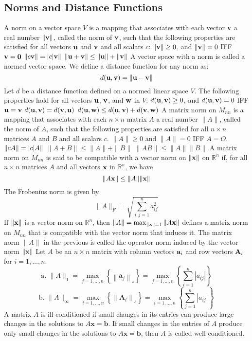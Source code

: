 \documentclass{article}
\begin{document}
        \subsection{Norms and Distance Functions} 
        \begin{outline}
            \1 A norm on a vector space $V$ is a mapping that associates with each vector $\vb v$ a real number $\|\vb v\|$, called the norm of $\vb v$, such that the following properties are satisfied for all vectors $\vb u$ and $\vb v$ and all scalars $c$:
            \2 \(\|\vb v\|\geq 0\), and \(\|\vb v\|=0\) IFF \(\vb v=\vb 0\)
            \2 \(\|c\vb v\|=|c\\|\vb v\|\)
            \2 \(\|\vb u+\vb v\|\leq\|\vb u\|+\|\vb v\|\)
        \1 A vector space with a norm is called a normed vector space. 
        \1 We define a distance function for any norm as: \[d(\vb u,\vb v)=\|\vb u-\vb v\|\]
        \1 Let $d$ be a distance function defined on a normed linear space $V$. The following properties hold for all vectors $\vb u$, $\vb v$, and $\vb w$ in $V$:
            \2 \(d(\vb u,\vb v)\geq 0\), and \(d(\vb u,\vb v)=0\) IFF \(\vb u=\vb v\)
            \2 \(d(\vb u,\vb v)=d(\vb v,\vb u)\) 
            \2 \(d(\vb u,\vb w)\leq d(\vb u,\vb v)+d(\vb v,\vb w)\)
        \1 A matrix norm on \(M_{nn}\) is a mapping that associates with each \(n\times n\) matrix $A$ a real number $\|A\|$, called the norm of $A$, such that the following properties are satisfied for all \(n\times n\) matrices $A$ and $B$ and all scalars $c$. 
            \2 \(\|A\|\geq 0\) and \(\|A\|=0\) IFF \(A=O\). 
            \2 \(\|cA\|=|c\\|A\|\)
            \2 \(\|A+B\|\leq\|A\|+\|B\|\)
            \2 \(\|AB\|\leq\|A\|\|B\|\)
        \1 A matrix norm on $M_{nn}$ is said to be compatible with a vector norm on \(\|\vb x\|\) on \(\mathbb R^n\) if, for all \(n\times n\) matrices $A$ and all vectors $\vb x$ in \(\mathbb R^n\), we have \[\|A\vb x\|\leq\|A\|\|\vb x\|\]
        \1 The Frobenius norm is given by \[\|A\|_F=\sqrt{\sum^n_{i,j=1}a^2_{ij}}\]
        \1 If \(\|\vb x\|\) is a vector norm on \(\mathbb R^n\), then \(\|A\|=\max_{\|\vb x\|=1}\|A\vb x\|\) defines a matrix norm on $M_{nn}$ that is compatible with the vector norm that induces it. 
        \1 The matrix norm $\|A\|$ in the previous is called the operator norm induced by the vector norm \(\|\vb x\|\)
        \1 Let $A$ be an \(n\times n\) matrix with column vectors \(\vb a_i\) and row vectors $\vb A_i$ for \(i=1,\ldots,n\). \[\text{a. }\|A\|_{1}=\max _{j=1, \ldots, n}\left\{\left\|\mathbf{a}_{j}\right\|_{s}\right\}=\max _{j=1, \ldots, n}\left\{\sum_{i=1}^{n}\left|a_{i j}\right|\right\}\]\[\text{b. }\|A\|_{\infty}=\max _{i=1, \ldots, n}\left\{\left\|\mathbf{A}_{i}\right\|_{s}\right\}=\max _{i=1, \ldots, n}\left\{\sum_{j=1}^{n}\left|a_{i j}\right|\right\}\]
        \1 A matrix $A$ is ill-conditioned if small changes in its entries can produce large changes in the solutions to $A \mathbf{x}=\mathbf{b}$. If small changes in the entries of $A$ produce only small changes in the solutions to $A \mathbf{x}=\mathbf{b}$, then $A$ is called well-conditioned.
    
        \end{outline}
\end{document}
